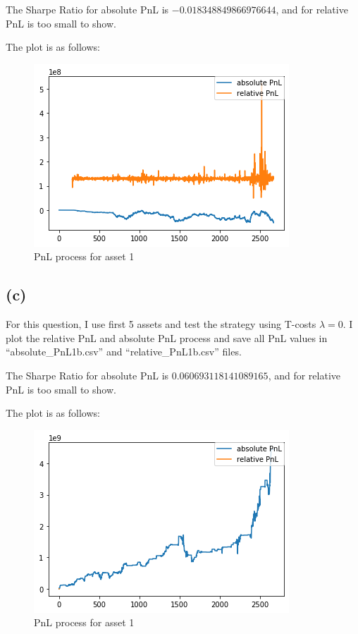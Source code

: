 \documentclass[letterpaper,11pt]{article}
\begin{document}
\begin{spacing}{1.2}
The Sharpe Ratio for absolute PnL is $-0.018348849866976644$, and for relative PnL is too small to show.

The plot is as follows:
\begin{figure}[h] %
\centering
\includegraphics[scale=0.5]{1b pnl.png}
\caption{PnL process for asset 1}
\label{fig:label}
\end{figure}

\subsection*{(c)}
For this question, I use first 5 assets and test the strategy using T-costs $\lambda = 0$. I plot the relative PnL and absolute PnL process and save all PnL values in ``absolute\_PnL1b.csv'' and ``relative\_PnL1b.csv'' files.

The Sharpe Ratio for absolute PnL is $0.060693118141089165$, and for relative PnL is too small to show.

The plot is as follows:
\begin{figure}[h] %
\centering
\includegraphics[scale=0.5]{2 pnl.png}
\caption{PnL process for asset 1}
\label{fig:label}
\end{figure}

\end{spacing}
\end{document}
